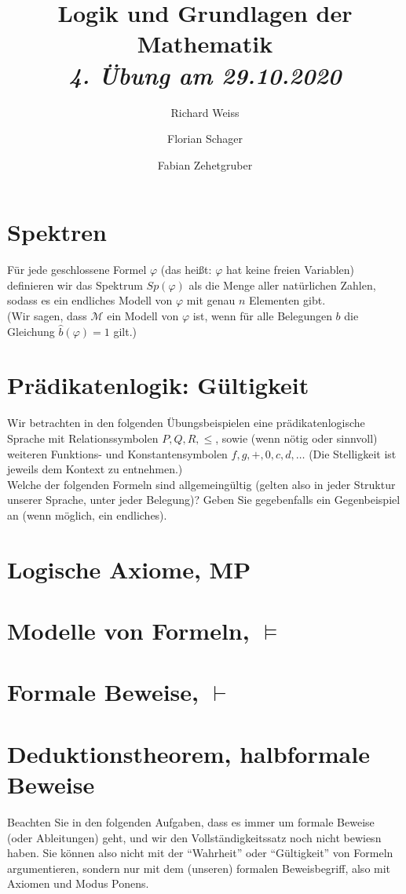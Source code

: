 \documentclass{article}
\title
{
  Logik und Grundlagen der Mathematik \\
  \vspace{4pt}
  \normalsize
  \textit{4. Übung am 29.10.2020}
}
\author
{
  Richard Weiss
  \and
  Florian Schager
  \and
  Fabian Zehetgruber
}
\date{}
\begin{document}
\maketitle

\section*{Spektren}

Für jede geschlossene Formel $\varphi$ (das heißt: $\varphi$ hat keine freien Variablen)
definieren wir das Spektrum $Sp(\varphi)$ als die Menge aller natürlichen Zahlen,
sodass es ein endliches Modell von $\varphi$ mit genau $n$ Elementen gibt. \\
(Wir sagen, dass $\mathcal{M}$ ein Modell von $\varphi$ ist, wenn für alle Belegungen
$b$ die Gleichung $\hat{b}(\varphi) = 1$ gilt.)



\section*{Prädikatenlogik: Gültigkeit}

Wir betrachten in den folgenden Übungsbeispielen eine prädikatenlogische Sprache
mit Relationssymbolen $P, Q, R, \leq$, sowie (wenn nötig oder sinnvoll) weiteren
Funktions- und Konstantensymbolen $f, g, +, 0, c, d, \dots$
(Die Stelligkeit ist jeweils dem Kontext zu entnehmen.) \\
Welche der folgenden Formeln sind allgemeingültig (gelten also in jeder Struktur
unserer Sprache, unter jeder Belegung)?
Geben Sie gegebenfalls ein Gegenbeispiel an (wenn möglich, ein endliches).



\section*{Logische Axiome, MP}



\section*{Modelle von Formeln, $\vDash$}



\section*{Formale Beweise, $\vdash$}




\section*{Deduktionstheorem, halbformale Beweise}

Beachten Sie in den folgenden Aufgaben, dass es immer um formale Beweise (oder Ableitungen)
geht, und wir den Vollständigkeitssatz noch nicht bewiesn haben. Sie können also
nicht mit der \enquote{Wahrheit} oder \enquote{Gültigkeit} von Formeln argumentieren,
sondern nur mit dem (unseren) formalen Beweisbegriff, also mit Axiomen und Modus Ponens.


\end{document}
